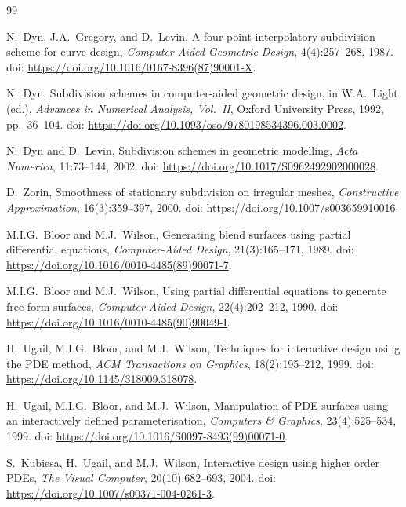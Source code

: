 \documentclass{article}
\theoremstyle{plain}
\theoremstyle{definition}
\begin{document}
\begin{thebibliography}{99}

N.\ Dyn, J.A.\ Gregory, and D.\ Levin,
A four-point interpolatory subdivision scheme for curve design,
\textit{Computer Aided Geometric Design}, 4(4):257--268, 1987.
doi: \url{https://doi.org/10.1016/0167-8396(87)90001-X}.

N.\ Dyn,
Subdivision schemes in computer-aided geometric design,
in W.A.\ Light (ed.), \textit{Advances in Numerical Analysis, Vol.\ II},
Oxford University Press, 1992, pp.\ 36--104.
doi: \url{https://doi.org/10.1093/oso/9780198534396.003.0002}.

N.\ Dyn and D.\ Levin,
Subdivision schemes in geometric modelling,
\textit{Acta Numerica}, 11:73--144, 2002.
doi: \url{https://doi.org/10.1017/S0962492902000028}.

D.\ Zorin,
Smoothness of stationary subdivision on irregular meshes,
\textit{Constructive Approximation}, 16(3):359--397, 2000.
doi: \url{https://doi.org/10.1007/s003659910016}.

M.I.G.\ Bloor and M.J.\ Wilson,
Generating blend surfaces using partial differential equations,
\textit{Computer-Aided Design}, 21(3):165--171, 1989.
doi: \url{https://doi.org/10.1016/0010-4485(89)90071-7}.

M.I.G.\ Bloor and M.J.\ Wilson,
Using partial differential equations to generate free-form surfaces,
\textit{Computer-Aided Design}, 22(4):202--212, 1990.
doi: \url{https://doi.org/10.1016/0010-4485(90)90049-I}.

H.\ Ugail, M.I.G.\ Bloor, and M.J.\ Wilson,
Techniques for interactive design using the PDE method,
\textit{ACM Transactions on Graphics}, 18(2):195--212, 1999.
doi: \url{https://doi.org/10.1145/318009.318078}.

H.\ Ugail, M.I.G.\ Bloor, and M.J.\ Wilson,
Manipulation of PDE surfaces using an interactively defined parameterisation,
\textit{Computers \& Graphics}, 23(4):525--534, 1999.
doi: \url{https://doi.org/10.1016/S0097-8493(99)00071-0}.

S.\ Kubiesa, H.\ Ugail, and M.J.\ Wilson,
Interactive design using higher order PDEs,
\textit{The Visual Computer}, 20(10):682--693, 2004.
doi: \url{https://doi.org/10.1007/s00371-004-0261-3}.


\end{thebibliography}
\end{document}
